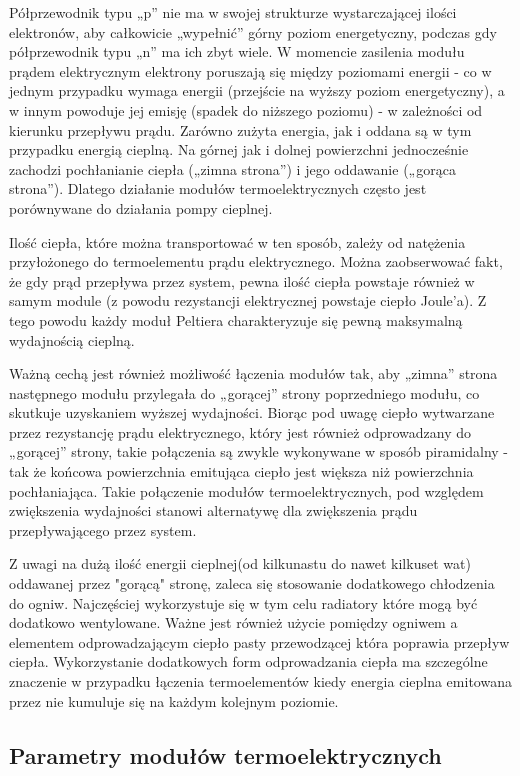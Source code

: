 \documentclass[oneside]{mgr}
\begin{document}
Półprzewodnik typu „p” nie ma w swojej strukturze wystarczającej ilości elektronów, aby całkowicie „wypełnić” górny poziom energetyczny, podczas gdy półprzewodnik typu „n” ma ich zbyt wiele. W momencie zasilenia modułu prądem elektrycznym elektrony poruszają się między poziomami energii - co w jednym przypadku wymaga energii (przejście na wyższy poziom energetyczny), a w innym powoduje jej emisję (spadek do niższego poziomu) - w zależności od kierunku przepływu prądu. Zarówno zużyta energia, jak i oddana są w tym przypadku energią cieplną. Na górnej jak i dolnej powierzchni jednocześnie zachodzi pochłanianie ciepła („zimna strona”) i jego oddawanie („gorąca strona”). Dlatego działanie modułów termoelektrycznych często jest porównywane do działania pompy cieplnej.

Ilość ciepła, które można transportować w ten sposób, zależy od natężenia przyłożonego do termoelementu prądu elektrycznego. Można zaobserwować fakt, że gdy prąd przepływa przez system, pewna ilość ciepła powstaje również w samym module (z powodu rezystancji elektrycznej powstaje ciepło Joule'a). Z tego powodu każdy moduł Peltiera charakteryzuje się  pewną maksymalną wydajnością cieplną.

Ważną cechą jest również możliwość łączenia modułów tak, aby „zimna” strona następnego modułu przylegała do „gorącej” strony poprzedniego modułu,
co skutkuje uzyskaniem wyższej wydajności. Biorąc pod uwagę ciepło wytwarzane przez rezystancję prądu elektrycznego, który jest również odprowadzany do „gorącej” strony, takie połączenia są zwykle wykonywane w sposób piramidalny - tak że końcowa powierzchnia emitująca ciepło jest większa niż powierzchnia pochłaniająca. Takie połączenie modułów termoelektrycznych, pod względem zwiększenia wydajności stanowi alternatywę dla zwiększenia prądu przepływającego przez system.

Z uwagi na dużą ilość energii cieplnej(od kilkunastu do nawet kilkuset wat) oddawanej przez "gorącą" stronę, zaleca się stosowanie dodatkowego chłodzenia do ogniw. Najczęściej wykorzystuje się w tym celu radiatory które mogą być dodatkowo wentylowane. Ważne jest również użycie pomiędzy ogniwem a elementem odprowadzającym ciepło pasty przewodzącej która poprawia przepływ ciepła. Wykorzystanie dodatkowych form odprowadzania ciepła ma szczególne znaczenie w przypadku łączenia termoelementów kiedy energia cieplna emitowana przez nie kumuluje się na każdym kolejnym poziomie. 

\subsection{Parametry modułów termoelektrycznych}
\end{document}
